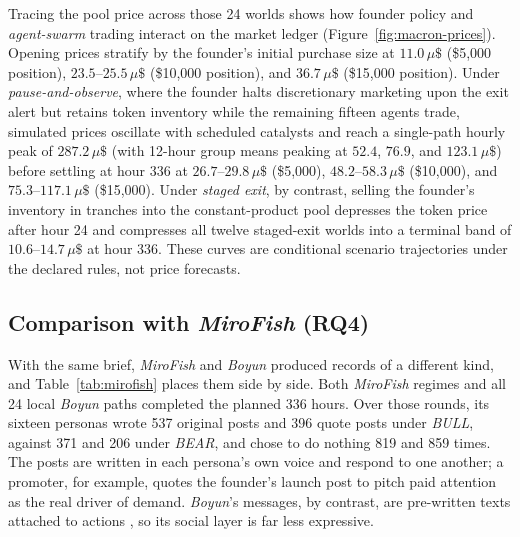 \begin{revised}
Tracing the pool price across those 24 worlds shows how founder policy and \textit{agent-swarm} trading interact on the market ledger (Figure~\ref{fig:macron-prices}). Opening prices stratify by the founder's initial purchase size at $11.0\,\mu\$$ (\$5{,}000 position), $23.5\text{--}25.5\,\mu\$$ (\$10{,}000 position), and $36.7\,\mu\$$ (\$15{,}000 position). Under \textit{pause-and-observe}, where the founder halts discretionary marketing upon the exit alert but retains token inventory while the remaining fifteen agents trade, simulated prices oscillate with scheduled catalysts and reach a single-path hourly peak of $287.2\,\mu\$$ (with 12-hour group means peaking at $52.4$, $76.9$, and $123.1\,\mu\$$) before settling at hour 336 at $26.7\text{--}29.8\,\mu\$$ (\$5{,}000), $48.2\text{--}58.3\,\mu\$$ (\$10{,}000), and $75.3\text{--}117.1\,\mu\$$ (\$15{,}000). Under \textit{staged exit}, by contrast, selling the founder's inventory in tranches into the constant-product pool depresses the token price after hour 24 and compresses all twelve staged-exit worlds into a terminal band of $10.6\text{--}14.7\,\mu\$$ at hour 336. These curves are conditional scenario trajectories under the declared rules, not price forecasts.
\end{revised}

\subsection{Comparison with \textit{MiroFish} (RQ4)}\label{sec:res-mirofish}
With the same brief, \textit{MiroFish} and \textit{Boyun} produced records
of a different kind, and Table~\ref{tab:mirofish} places them side by side.
Both \textit{MiroFish} regimes and all 24 local \textit{Boyun} paths
completed the planned 336 hours. Over those rounds, its
sixteen personas wrote 537 original posts and 396 quote posts under
\textit{BULL}, against 371 and 206 under \textit{BEAR}, and chose to do
nothing 819 and 859 times. The posts are written in each persona's own voice and
respond to one another; a promoter, for example, quotes the founder's launch
post to pitch paid attention as the real driver of demand.
\textit{Boyun}'s  messages, by contrast, are pre-written texts attached to
actions , so its social layer is far less expressive.

